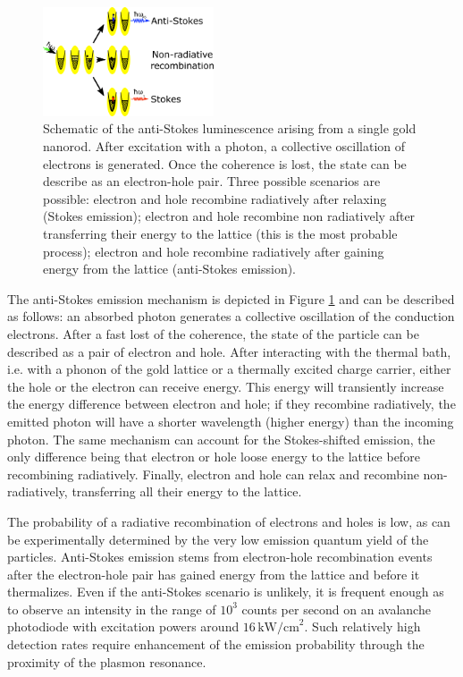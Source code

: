 \documentclass[journal=nalefd,manuscript=letter]{achemso}
\newcommand{\pwr}{\ensuremath{\,\textrm{kW/cm}^2}}
\begin{document}
\begin{figure}[htp]
\centering
	\includegraphics[width=0.45\textwidth]{Figures/02_Scheme/luminescence_all_AS.png}
	\caption{Schematic of the anti-Stokes luminescence arising from a single gold
	nanorod. After excitation with a photon, a collective oscillation of electrons
	is generated. Once the coherence is lost, the state can be describe as an
	electron-hole pair. Three possible scenarios are possible: electron and hole
	recombine radiatively after relaxing (Stokes emission); electron and hole
	recombine non radiatively after transferring their energy to the lattice
	(this is the most probable process); electron and hole recombine
	radiatively after gaining energy from the lattice (anti-Stokes emission).}
	\label{fig:anti-Stokes-process}
\end{figure}

The anti-Stokes emission mechanism\cite{He2015} is depicted in Figure
\ref{fig:anti-Stokes-process} and can be described as follows: an absorbed
photon generates a collective oscillation of the conduction electrons. After a
fast lost of the coherence\cite{Sonnichsen2002}, the state of the particle can
be described as a pair of electron and hole. After interacting with the thermal
bath, i.e. with a phonon of the gold lattice\cite{Lin2008} or a thermally
excited charge carrier\cite{Sun1994}, either the hole or the electron can
receive energy. This energy will transiently increase the energy difference between electron and
hole; if they recombine radiatively, the emitted photon will have a shorter
wavelength (higher energy) than the incoming photon\cite{Huang2014}. The same
mechanism can account for the Stokes-shifted emission, the only difference being
that electron or hole loose energy to the lattice before recombining
radiatively. Finally, electron and hole can relax and recombine
non-radiatively, transferring all their energy to the lattice. 

The probability of a radiative recombination of electrons and holes is low,
as can be experimentally determined by the very low emission quantum yield of
the particles\cite{Yorulmaz2012}\cite{Rao2015}\cite{Sonnichsen2002}. Anti-Stokes
emission stems from electron-hole recombination events after the electron-hole
pair has gained energy from the lattice and before it thermalizes. Even if the
anti-Stokes scenario is unlikely, it is frequent enough as to observe an
intensity in the range of $10^3$ counts per second on an avalanche photodiode
with excitation powers around $16\pwr$. Such relatively high detection rates
require enhancement of the emission probability through the proximity of the
plasmon resonance\cite{Neupane2013}.
\end{document}
